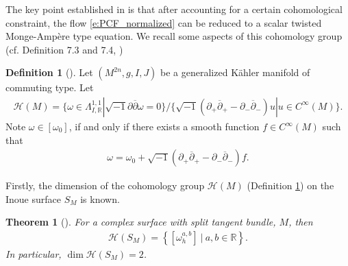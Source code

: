 \documentclass[12pt]{amsart}
\numberwithin{equation}{section}
\newtheorem{thm}[prop]{Theorem}
\numberwithin{prop}{section}
\theoremstyle{definition}
\newtheorem{defn}[prop]{Definition}
\renewcommand{\bar}[1]{\overline{#1}}
\begin{document}
The key point established in \cite{StreetsSTB} is that after accounting for a certain cohomological constraint, the flow \ref{e:PCF_normalized} can be reduced to a scalar twisted Monge-Amp\`ere type equation.  We recall some aspects of this cohomology group (cf. \cite{StreetsPCFBI} Definition 7.3 and 7.4, \cite{GRFbook})
\begin{defn}[\cite{StreetsPCFBI}]\label{d:cohomology of splitting type}
    Let $(M^{2n},g,I,J)$ be a generalized Kähler manifold of commuting type.  Let
    \begin{align*}
        \mathcal{H}(M) = \{\omega\in \Lambda_{I,\mathbb{R}}^{1,1}|\sqrt{-1}\partial\bar{\partial}\omega = 0\}/\{\sqrt{-1}(\partial_+\bar{\partial}_+ - \partial_-\bar{\partial}_-)u|u\in C^\infty(M)\}.
    \end{align*}
Note $\omega\in [\omega_0]$, if and only if there exists a smooth function $f\in C^\infty(M)$ such that
\begin{align}\label{e:ddbar lemma for GK}
    \omega = \omega_0 + \sqrt{-1}(\partial_+ \bar{\partial}_{+} - \partial_-\bar{\partial}_-)f.
\end{align}
\end{defn}

Firstly, the dimension of the cohomology group $\mathcal{H}(M)$ (Definition \ref{d:cohomology of splitting type}) on the Inoue surface $S_M$ is known.
\begin{thm}[\cite{HaoJosh}] \label{t:haojosh}
    For a complex surface with split tangent bundle, $M$, then 
    \begin{align*}
        \mathcal H(S_M) = \left\{  [\omega_h^{a,b}]\ |\ a, b \in \mathbb R \right\}.
    \end{align*}
    In particular, $\dim \mathcal H(S_M) = 2$.
\end{thm}
\end{document}
